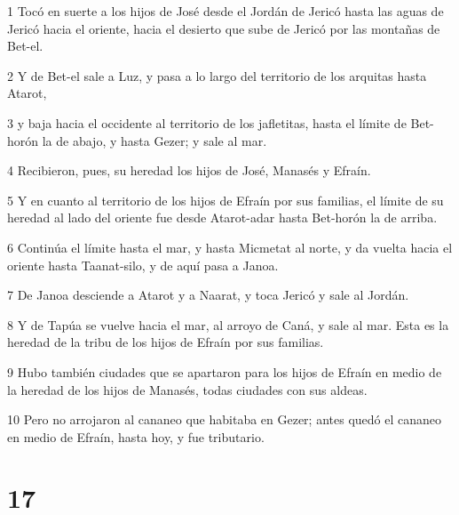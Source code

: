 \par 1 Tocó en suerte a los hijos de José desde el Jordán de Jericó hasta las aguas de Jericó hacia el oriente, hacia el desierto que sube de Jericó por las montañas de Bet-el.
\par 2 Y de Bet-el sale a Luz, y pasa a lo largo del territorio de los arquitas hasta Atarot,
\par 3 y baja hacia el occidente al territorio de los jafletitas, hasta el límite de Bet-horón la de abajo, y hasta Gezer; y sale al mar.
\par 4 Recibieron, pues, su heredad los hijos de José, Manasés y Efraín.
\par 5 Y en cuanto al territorio de los hijos de Efraín por sus familias, el límite de su heredad al lado del oriente fue desde Atarot-adar hasta Bet-horón la de arriba.
\par 6 Continúa el límite hasta el mar, y hasta Micmetat al norte, y da vuelta hacia el oriente hasta Taanat-silo, y de aquí pasa a Janoa.
\par 7 De Janoa desciende a Atarot y a Naarat, y toca Jericó y sale al Jordán.
\par 8 Y de Tapúa se vuelve hacia el mar, al arroyo de Caná, y sale al mar. Esta es la heredad de la tribu de los hijos de Efraín por sus familias.
\par 9 Hubo también ciudades que se apartaron para los hijos de Efraín en medio de la heredad de los hijos de Manasés, todas ciudades con sus aldeas.
\par 10 Pero no arrojaron al cananeo que habitaba en Gezer; antes quedó el cananeo en medio de Efraín, hasta hoy, y fue tributario.

\chapter{17}

